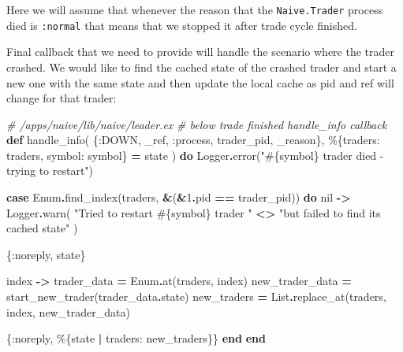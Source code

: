 \documentclass[
  oneside]{book}
\newenvironment{Shaded}{\begin{snugshade}}{\end{snugshade}}
\newcommand{\CommentTok}[1]{\textcolor[rgb]{0.56,0.35,0.01}{\textit{#1}}}
\newcommand{\ConstantTok}[1]{\textcolor[rgb]{0.00,0.00,0.00}{#1}}
\newcommand{\DecValTok}[1]{\textcolor[rgb]{0.00,0.00,0.81}{#1}}
\newcommand{\KeywordTok}[1]{\textcolor[rgb]{0.13,0.29,0.53}{\textbf{#1}}}
\newcommand{\NormalTok}[1]{#1}
\newcommand{\OperatorTok}[1]{\textcolor[rgb]{0.81,0.36,0.00}{\textbf{#1}}}
\newcommand{\OtherTok}[1]{\textcolor[rgb]{0.56,0.35,0.01}{#1}}
\newcommand{\StringTok}[1]{\textcolor[rgb]{0.31,0.60,0.02}{#1}}
\newcommand{\VariableTok}[1]{\textcolor[rgb]{0.00,0.00,0.00}{#1}}
\begin{document}
Here we will assume that whenever the reason that the \texttt{Naive.Trader} process died is \texttt{:normal} that means that we stopped it after trade cycle finished.

Final callback that we need to provide will handle the scenario where the trader crashed. We would like to find the cached state of the crashed trader and start a new one with the same state and then update the local cache as pid and ref will change for that trader:

\begin{Shaded}
\begin{Highlighting}[]
  \CommentTok{\# /apps/naive/lib/naive/leader.ex}
  \CommentTok{\# below trade finished handle\_info callback}
  \KeywordTok{def}\NormalTok{ handle\_info(}
\NormalTok{        \{}\VariableTok{:DOWN}\NormalTok{, \_ref, }\VariableTok{:process}\NormalTok{, trader\_pid, \_reason\},}
\NormalTok{        \%\{}\VariableTok{traders:}\NormalTok{ traders, }\VariableTok{symbol:}\NormalTok{ symbol\} }\OperatorTok{=}\NormalTok{ state}
\NormalTok{      ) }\KeywordTok{do}
    \ConstantTok{Logger}\OperatorTok{.}\NormalTok{error(}\StringTok{"}\OtherTok{\#\{}\NormalTok{symbol}\OtherTok{\}}\StringTok{ trader died {-} trying to restart"}\NormalTok{)}

    \KeywordTok{case} \ConstantTok{Enum}\OperatorTok{.}\NormalTok{find\_index(traders, }\OperatorTok{\&}\NormalTok{(}\OperatorTok{\&}\DecValTok{1}\OperatorTok{.}\NormalTok{pid }\OperatorTok{==}\NormalTok{ trader\_pid)) }\KeywordTok{do}
      \ConstantTok{nil} \OperatorTok{{-}\textgreater{}}
        \ConstantTok{Logger}\OperatorTok{.}\NormalTok{warn(}
          \StringTok{"Tried to restart }\OtherTok{\#\{}\NormalTok{symbol}\OtherTok{\}}\StringTok{ trader "} \OperatorTok{\textless{}\textgreater{}}
            \StringTok{"but failed to find its cached state"}
\NormalTok{        )}

\NormalTok{        \{}\VariableTok{:noreply}\NormalTok{, state\}}

\NormalTok{      index }\OperatorTok{{-}\textgreater{}}
\NormalTok{        trader\_data }\OperatorTok{=} \ConstantTok{Enum}\OperatorTok{.}\NormalTok{at(traders, index)}
\NormalTok{        new\_trader\_data }\OperatorTok{=}\NormalTok{ start\_new\_trader(trader\_data}\OperatorTok{.}\NormalTok{state)}
\NormalTok{        new\_traders }\OperatorTok{=} \ConstantTok{List}\OperatorTok{.}\NormalTok{replace\_at(traders, index, new\_trader\_data)}

\NormalTok{        \{}\VariableTok{:noreply}\NormalTok{, \%\{state }\OperatorTok{|} \VariableTok{traders:}\NormalTok{ new\_traders\}\}}
    \KeywordTok{end}
  \KeywordTok{end}
\end{Highlighting}
\end{Shaded}
\end{document}
